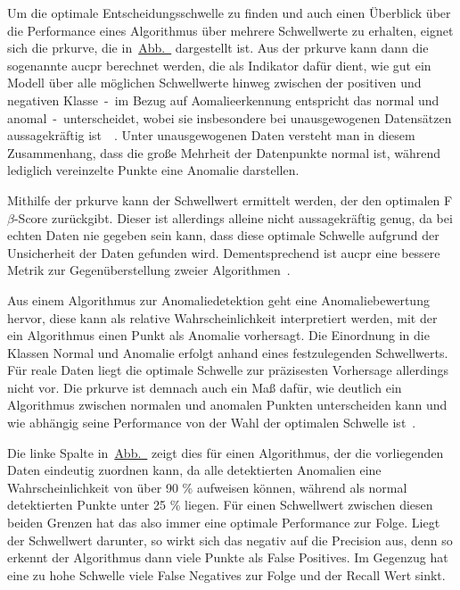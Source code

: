 Um die optimale Entscheidungsschwelle zu finden und auch einen Überblick über die Performance eines Algorithmus über mehrere Schwellwerte
zu erhalten, eignet sich die \ac{prkurve}, die in~\hyperref[fig:auc_pr_beispiel]{Abb.~} dargestellt
ist. Aus der \ac{prkurve} kann dann die sogenannte \ac{aucpr}
berechnet werden, die als Indikator dafür dient, wie gut ein Modell über alle möglichen Schwellwerte hinweg zwischen der positiven und
negativen Klasse~-~im Bezug auf Aomalieerkennung entspricht das normal und anomal~-~unterscheidet, wobei sie insbesondere bei
unausgewogenen Datensätzen aussagekräftig ist~\cite{Davis2006}~\cite{Schmidl2022}. Unter unausgewogenen Daten versteht man in diesem Zusammenhang,
dass die große Mehrheit der Datenpunkte normal ist, während lediglich vereinzelte Punkte eine Anomalie darstellen.

Mithilfe der \ac{prkurve} kann der Schwellwert ermittelt werden, der den optimalen F$\beta$-Score zurückgibt. Dieser ist allerdings
alleine nicht aussagekräftig genug, da bei echten Daten nie gegeben sein kann, dass diese optimale Schwelle aufgrund der Unsicherheit der
Daten gefunden wird. Dementsprechend ist \ac{aucpr} eine bessere Metrik zur Gegenüberstellung zweier Algorithmen~\cite{Japkowicz2002}.

Aus einem Algorithmus zur Anomaliedetektion geht eine Anomaliebewertung hervor, diese kann als relative Wahrscheinlichkeit interpretiert werden,
mit der ein Algorithmus einen Punkt als Anomalie vorhersagt. Die Einordnung in die Klassen Normal und Anomalie erfolgt anhand eines festzulegenden
Schwellwerts. Für reale Daten liegt die optimale Schwelle zur präzisesten Vorhersage allerdings nicht vor. Die \ac{prkurve} ist demnach auch ein
Maß dafür, wie deutlich ein Algorithmus zwischen normalen und anomalen Punkten unterscheiden kann und wie abhängig seine Performance von der
Wahl der optimalen Schwelle ist~\cite{Japkowicz2002}.

Die linke Spalte in~\hyperref[fig:auc_pr_beispiel]{Abb.~} zeigt dies für einen Algorithmus, der die vorliegenden Daten
eindeutig zuordnen kann, da alle detektierten Anomalien eine Wahrscheinlichkeit von über 90 \% aufweisen können, während als normal detektierten
Punkte unter 25 \% liegen. Für einen Schwellwert zwischen diesen beiden Grenzen hat das also immer eine optimale Performance zur Folge. Liegt der
Schwellwert darunter, so wirkt sich das negativ auf die Precision aus, denn so erkennt der Algorithmus dann viele Punkte als False Positives.
Im Gegenzug hat eine zu hohe Schwelle viele False Negatives zur Folge und der Recall Wert sinkt.

